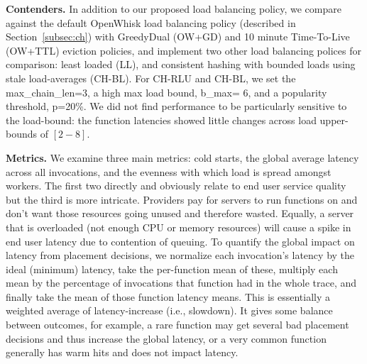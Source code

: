 \noindent \textbf{Contenders.}
In addition to our proposed load balancing policy, we compare against the default OpenWhisk load balancing policy (described in Section~\ref{subsec:ch}) with GreedyDual (OW+GD) and 10 minute Time-To-Live (OW+TTL) eviction policies, and implement two other load balancing polices for comparison: least loaded (LL), and consistent hashing with bounded loads using stale load-averages (CH-BL). 
For CH-RLU and CH-BL, we set the max\_chain\_len=3, a high max load bound, b\_max= 6, and a popularity threshold, p=20\%. 
We did not find performance to be particularly sensitive to the load-bound: the function latencies showed little changes across load upper-bounds of $[2-8]$. 




\noindent \textbf{Metrics.}
We examine three main metrics: cold starts, the global average latency across all invocations, and the evenness with which load is spread amongst workers.
%
The first two directly and obviously relate to end user service quality but the third is more intricate. 
Providers pay for servers to run functions on and don't want those resources going unused and therefore wasted.
Equally, a server that is overloaded (not enough CPU or memory resources) will cause a spike in end user latency due to contention of queuing.
%
To quantify the global impact on latency from placement decisions, we normalize each invocation's latency by the ideal (minimum) latency, take the per-function mean of these, multiply each mean by the percentage of invocations that function had in the whole trace, and finally take the mean of those function latency means.
This is essentially a weighted average of latency-increase (i.e., slowdown).
It gives some balance between outcomes, for example, a rare function may get several bad placement decisions and thus increase the global latency, or a very common function generally has warm hits and does not impact latency. 



